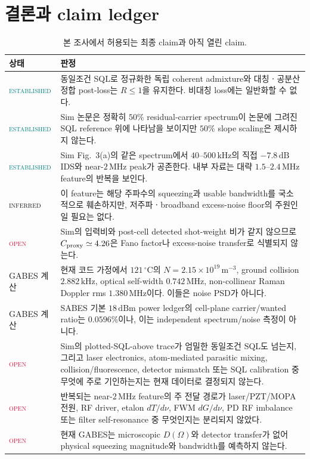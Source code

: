 \documentclass[11pt,a4paper]{article}
\newcommand{\MHz}{\,\mathrm{MHz}}
\newcommand{\kHz}{\,\mathrm{kHz}}
\newcommand{\dB}{\,\mathrm{dB}}
\newcommand{\degC}{\,^{\circ}\mathrm C}
\newcommand{\status}[1]{\textsc{#1}}
\newcommand{\established}{\textcolor{teal}{\status{established}}}
\newcommand{\inferred}{\textcolor{amber}{\status{inferred}}}
\newcommand{\openclaim}{\textcolor{crimson}{\status{open}}}
\begin{document}
\section{결론과 claim ledger}

\begin{table}[H]
\centering
\caption{본 조사에서 허용되는 최종 claim과 아직 열린 claim.}
\label{tab:claim-ledger}
\small
\begin{tabularx}{\textwidth}{L{2.5cm}Y}
\toprule
상태 & 판정\\
\midrule
\established & 동일조건 SQL로 정규화한 독립 coherent admixture와 대칭ㆍ공분산 정합
post-loss는 $R\le1$을 유지한다. 비대칭 loss에는 일반화할 수 없다.\\
\established & Sim 논문은 정확히 $50\%$ residual-carrier spectrum이 논문에 그려진
SQL reference 위에 나타남을 보이지만 $50\%$ slope scaling은 제시하지 않는다.\\
\established & Sim Fig.~3(a)의 같은 spectrum에서 $40$--$500\kHz$의 직접
$-7.8\dB$ IDS와 near-$2\MHz$ peak가 공존한다. 내부 자료는 대략
$1.5$--$2.4\MHz$ feature의 반복을 보인다.\\
\inferred & 이 feature는 해당 주파수의 squeezing과 usable bandwidth를 국소적으로
훼손하지만, 저주파ㆍbroadband excess-noise floor의 주원인일 필요는 없다.\\
\openclaim & Sim의 입력비와 post-cell detected shot-weight 비가 같지 않으므로
$C_{\rm proxy}\simeq4.26$은 Fano factor나 excess-noise transfer로 식별되지 않는다.\\
GABES 계산 & 현재 코드 가정에서 $121\degC$의 $N=2.15\times10^{19}\,\mathrm{m}^{-3}$,
ground collision $2.882\kHz$, optical self-width $0.742\MHz$, non-collinear
Raman Doppler rms $1.380\MHz$이다. 이들은 noise PSD가 아니다.\\
GABES 계산 & SABES 기본 $18\,\mathrm{dBm}$ power ledger의 cell-plane carrier/wanted
ratio는 $0.0596\%$이나, 이는 independent spectrum/noise 측정이 아니다.\\
\openclaim & Sim의 plotted-SQL-above trace가 엄밀한 동일조건 SQL도 넘는지, 그리고
laser electronics, atom-mediated parasitic
mixing, collision/fluorescence, detector mismatch 또는 SQL calibration 중 무엇에
주로 기인하는지는 현재 데이터로 결정되지 않는다.\\
\openclaim & 반복되는 near-$2\MHz$ feature의 주 전달 경로가 laser/PZT/MOPA 전원,
RF driver, etalon $dT/d\nu$, FWM $dG/d\nu$, PD RF imbalance 또는 filter self-resonance
중 무엇인지는 분리되지 않았다.\\
\openclaim & 현재 GABES는 microscopic $D(\Omega)$와 detector transfer가 없어
physical squeezing magnitude와 bandwidth를 예측하지 않는다.\\
\bottomrule
\end{tabularx}
\end{table}
\end{document}
